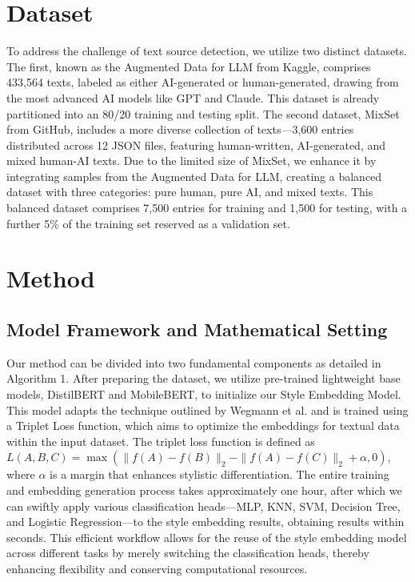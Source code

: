 \documentclass{article}
\begin{document}
\section{Dataset}

To address the challenge of text source detection, we utilize two distinct datasets. The first, known as the Augmented Data for LLM from Kaggle\cite{augmenteddataforllm}, comprises 433,564 texts, labeled as either AI-generated or human-generated, drawing from the most advanced AI models like GPT and Claude. This dataset is already partitioned into an 80/20 training and testing split. The second dataset, MixSet\cite{MixSet} from GitHub, includes a more diverse collection of texts—3,600 entries distributed across 12 JSON files, featuring human-written, AI-generated, and mixed human-AI texts. Due to the limited size of MixSet, we enhance it by integrating samples from the Augmented Data for LLM, creating a balanced dataset with three categories: pure human, pure AI, and mixed texts. This balanced dataset comprises 7,500 entries for training and 1,500 for testing, with a further 5\% of the training set reserved as a validation set.

\section{Method}

\subsection{Model Framework and Mathematical Setting}

Our method can be divided into two fundamental components as detailed in Algorithm 1. After preparing the dataset, we utilize pre-trained lightweight base models, DistilBERT and MobileBERT, to initialize our Style Embedding Model. This model adapts the technique outlined by Wegmann et al.\cite{StyleEmbedding} and is trained using a Triplet Loss function, which aims to optimize the embeddings for textual data within the input dataset. The triplet loss function is defined as \( L(A, B, C) = \max(\|f(A) - f(B)\|_2 - \|f(A) - f(C)\|_2 + \alpha, 0) \), where \( \alpha \) is a margin that enhances stylistic differentiation. The entire training and embedding generation process takes approximately one hour, after which we can swiftly apply various classification heads—MLP, KNN, SVM, Decision Tree, and Logistic Regression—to the style embedding results, obtaining results within seconds. This efficient workflow allows for the reuse of the style embedding model across different tasks by merely switching the classification heads, thereby enhancing flexibility and conserving computational resources.
\end{document}
